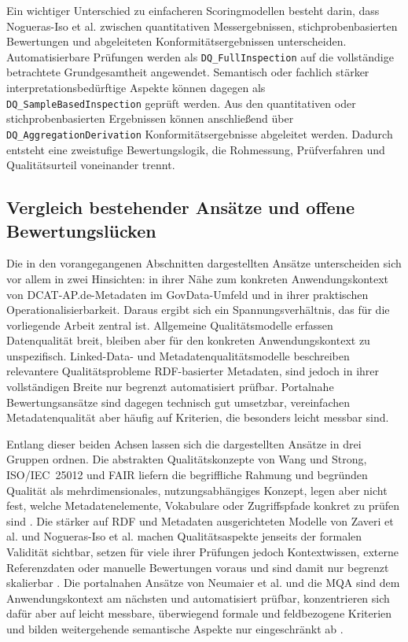 Ein wichtiger Unterschied zu einfacheren Scoringmodellen besteht darin, dass Nogueras-Iso et al. zwischen quantitativen Messergebnissen, stichprobenbasierten Bewertungen und abgeleiteten Konformitätsergebnissen unterscheiden. Automatisierbare Prüfungen werden als \texttt{DQ\_FullInspection} auf die vollständige betrachtete Grundgesamtheit angewendet. Semantisch oder fachlich stärker interpretationsbedürftige Aspekte können dagegen als \texttt{DQ\_SampleBasedInspection} geprüft werden. Aus den quantitativen oder stichprobenbasierten Ergebnissen können anschließend über \texttt{DQ\_\allowbreak Aggregation\allowbreak Derivation} Konformitätsergebnisse abgeleitet werden. Dadurch entsteht eine zweistufige Bewertungslogik, die Rohmessung, Prüfverfahren und Qualitätsurteil voneinander trennt. \cite{noguerasiso_quality_metadata}

\subsection{Vergleich bestehender Ansätze und offene Bewertungslücken}

Die in den vorangegangenen Abschnitten dargestellten Ansätze unterscheiden sich vor allem in zwei Hinsichten: in ihrer Nähe zum konkreten Anwendungskontext von DCAT-AP.de-Metadaten im GovData-Umfeld und in ihrer praktischen Operationalisierbarkeit. Daraus ergibt sich ein Spannungsverhältnis, das für die vorliegende Arbeit zentral ist. Allgemeine Qualitätsmodelle erfassen Datenqualität breit, bleiben aber für den konkreten Anwendungskontext zu unspezifisch. Linked-Data- und Metadatenqualitätsmodelle beschreiben relevantere Qualitätsprobleme RDF-basierter Metadaten, sind jedoch in ihrer vollständigen Breite nur begrenzt automatisiert prüfbar. Portalnahe Bewertungsansätze sind dagegen technisch gut umsetzbar, vereinfachen Metadatenqualität aber häufig auf Kriterien, die besonders leicht messbar sind.

Entlang dieser beiden Achsen lassen sich die dargestellten Ansätze in drei Gruppen
ordnen. Die abstrakten Qualitätskonzepte von Wang und Strong, ISO/IEC~25012 und
FAIR liefern die begriffliche Rahmung und begründen Qualität als
mehrdimensionales, nutzungsabhängiges Konzept, legen aber nicht fest, welche
Metadatenelemente, Vokabulare oder Zugriffspfade konkret zu prüfen sind
\cite{wang1996beyond, iso25012, wilkinson2016fair}. Die stärker auf RDF und
Metadaten ausgerichteten Modelle von Zaveri et al. und Nogueras-Iso et al. machen
Qualitätsaspekte jenseits der formalen Validität sichtbar, setzen für viele ihrer
Prüfungen jedoch Kontextwissen, externe Referenzdaten oder manuelle Bewertungen
voraus und sind damit nur begrenzt skalierbar \cite{Zaveri2016LinkedDataQuality,
noguerasiso_quality_metadata}. Die portalnahen Ansätze von Neumaier et al. und die
MQA sind dem Anwendungskontext am nächsten und automatisiert prüfbar,
konzentrieren sich dafür aber auf leicht messbare, überwiegend formale und
feldbezogene Kriterien und bilden weitergehende semantische Aspekte nur
eingeschränkt ab \cite{Neumaier2016MetadataQuality, wentzel2023extensive}.

